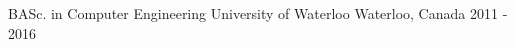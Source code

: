 \begin{cventries}
  \cventry
    {BASc. in Computer Engineering}
    {University of Waterloo}
    {Waterloo, Canada}
    {2011 - 2016}
    {}
    \vspace{-4mm}

\end{cventries}
